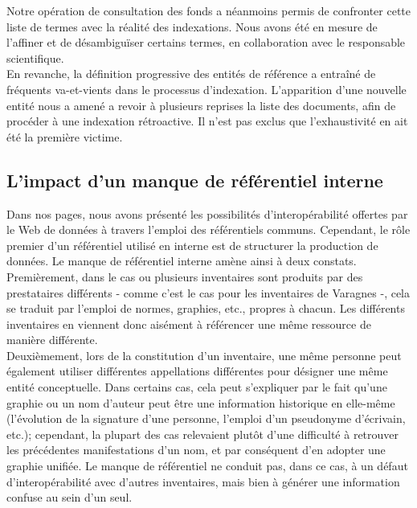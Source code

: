 \documentclass[a4paper,12pt,twoside]{book}
\begin{document}
Notre opération de consultation des fonds a néanmoins permis de confronter cette liste de termes avec la réalité des indexations. Nous avons été en mesure de l'affiner et de désambiguïser certains termes, en collaboration avec le responsable scientifique.\\

En revanche, la définition progressive des entités de référence a entraîné de fréquents va-et-vients dans le processus d'indexation. L'apparition d'une nouvelle entité nous a amené a revoir à plusieurs reprises la liste des documents, afin de procéder à une indexation rétroactive. Il n'est pas exclus que l'exhaustivité en ait été la première victime.  



\subsection{L'impact d'un manque de référentiel interne}

Dans nos pages, nous avons présenté les possibilités d'interopérabilité offertes par le Web de données à travers l'emploi des référentiels communs. Cependant, le rôle premier d'un référentiel utilisé en interne est de structurer la production de données. Le manque de référentiel interne amène ainsi à deux constats.\\

Premièrement, dans le cas ou plusieurs inventaires sont produits par des prestataires différents - comme c'est le cas pour les inventaires de Varagnes -, cela se traduit par l'emploi de normes, graphies, etc., propres à chacun. Les différents inventaires en viennent donc aisément à référencer une même ressource de manière différente.\\

Deuxièmement, lors de la constitution d'un inventaire, une même personne peut également utiliser différentes appellations différentes pour désigner une même entité conceptuelle. Dans certains cas, cela peut s'expliquer par le fait qu'une graphie ou un nom d'auteur peut être une information historique en elle-même (l'évolution de la signature d'une personne, l'emploi d'un pseudonyme d'écrivain, etc.); cependant, la plupart des cas relevaient plutôt d'une difficulté à retrouver les précédentes manifestations d'un nom, et par conséquent d'en adopter une graphie unifiée. Le manque de référentiel ne conduit pas, dans ce cas, à un défaut d'interopérabilité avec d'autres inventaires, mais bien à générer une information confuse au sein d'un seul. \\
\end{document}

